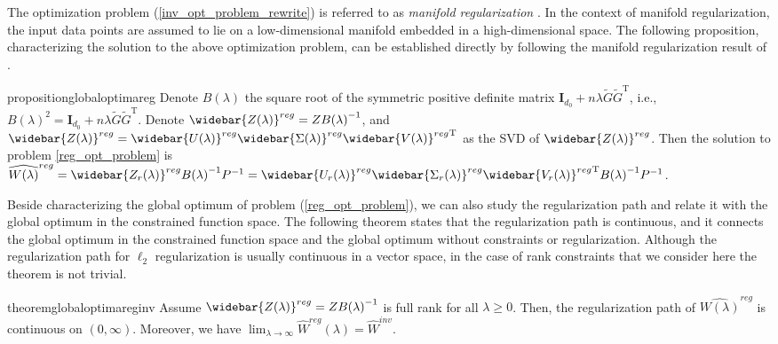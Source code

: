\documentclass{article}
\newcommand{\T}{\mathrm{T}}
\theoremstyle{plain}
\theoremstyle{definition}
\theoremstyle{remark}
\theoremstyle{remark}
\begin{document}
The optimization problem (\ref{inv_opt_problem_rewrite}) is referred to as \textit{manifold regularization} \citep{Zhang2013}. In the context of manifold regularization, the input data points are assumed to lie on a low-dimensional manifold embedded in a high-dimensional space. The following proposition, characterizing the solution to the above optimization problem, can be established directly by following the manifold regularization result of \citet[][Theorem 1]{Zhang2013}.

\begin{restatable}{proposition}{globaloptimareg}
  \label{global_optima_reg}
  Denote $B(\lambda)$ the square root of the symmetric positive definite matrix $\mathbf{I}_{d_0}+n\lambda\widetilde{G}\widetilde{G}^{\T}$, i.e., ${B(\lambda)}^2 = \mathbf{I}_{d_0}+n\lambda\widetilde{G}\widetilde{G}^{\T}$. 
  Denote $\widebar{Z(\lambda)}^{reg} = Z{B(\lambda)}^{-1}$, and $\widebar{Z(\lambda)}^{reg} = \widebar{U(\lambda)}^{reg} \widebar{\Sigma(\lambda)}^{reg}{\widebar{V(\lambda)}^{reg}}^{\T}$ as the SVD of $\widebar{Z(\lambda)}^{reg}$. Then the solution to %
  problem \ref{reg_opt_problem} is $\widehat{W(\lambda)}^{reg} = \widebar{Z_r(\lambda)}^{reg} {B(\lambda)}^{-1} P^{-1} = \widebar{U_r(\lambda)}^{reg} \widebar{\Sigma_r(\lambda)}^{reg} {\widebar{V_r(\lambda)}^{reg}}^{\T} {B(\lambda)}^{-1} P^{-1}$.
\end{restatable}

Beside characterizing the global optimum of problem (\ref{reg_opt_problem}), we can also study the regularization path and relate it with the global optimum in the constrained function space. 
The following theorem states that the regularization path is continuous, and it connects the global optimum in the constrained function space and the global optimum without constraints or regularization. Although the regularization path for $\ell_2$ regularization is usually continuous in a vector space, in the case of rank constraints that we consider here the theorem is not trivial.

\begin{restatable}{theorem}{globaloptimareginv}
  \label{global_optima_reg_inv}
  Assume $\widebar{Z(\lambda)}^{reg} = Z {B(\lambda)}^{-1}$ is full rank for all $\lambda \geq 0$. Then, the regularization path of $\widehat{W(\lambda)}^{reg}$ is continuous on $(0, \infty)$. Moreover, we have $\lim_{\lambda \rightarrow \infty} \widehat{W}^{reg}(\lambda) =  \widehat{W}^{inv}$.
\end{restatable}
\end{document}
